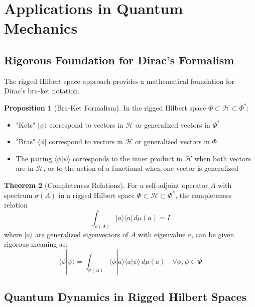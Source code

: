 \documentclass[12pt,a4paper]{article}
\theoremstyle{definition}
\newtheorem{theorem}{Theorem}
\newtheorem{proposition}[theorem]{Proposition}
\begin{document}
\section{Applications in Quantum Mechanics}

\subsection{Rigorous Foundation for Dirac's Formalism}

The rigged Hilbert space approach provides a mathematical foundation for Dirac's bra-ket notation.

\begin{proposition}[Bra-Ket Formalism]
In the rigged Hilbert space $\Phi \subset \mathcal{H} \subset \Phi^*$:
\begin{itemize}
    \item "Kets" $|\psi\rangle$ correspond to vectors in $\mathcal{H}$ or generalized vectors in $\Phi^*$
    \item "Bras" $\langle\phi|$ correspond to vectors in $\mathcal{H}$ or generalized vectors in $\Phi$
    \item The pairing $\langle\phi|\psi\rangle$ corresponds to the inner product in $\mathcal{H}$ when both vectors are in $\mathcal{H}$, or to the action of a functional when one vector is generalized
\end{itemize}
\end{proposition}

\begin{theorem}[Completeness Relations]
For a self-adjoint operator $A$ with spectrum $\sigma(A)$ in a rigged Hilbert space $\Phi \subset \mathcal{H} \subset \Phi^*$, the completeness relation
\begin{equation}
    \int_{\sigma(A)} |a\rangle\langle a| \, d\mu(a) = I
\end{equation}
where $|a\rangle$ are generalized eigenvectors of $A$ with eigenvalue $a$, can be given rigorous meaning as:
\begin{equation}
    \langle\phi|\psi\rangle = \int_{\sigma(A)} \langle\phi|a\rangle\langle a|\psi\rangle \, d\mu(a) \quad \forall \phi, \psi \in \Phi
\end{equation}
\end{theorem}

\subsection{Quantum Dynamics in Rigged Hilbert Spaces}
\end{document}
